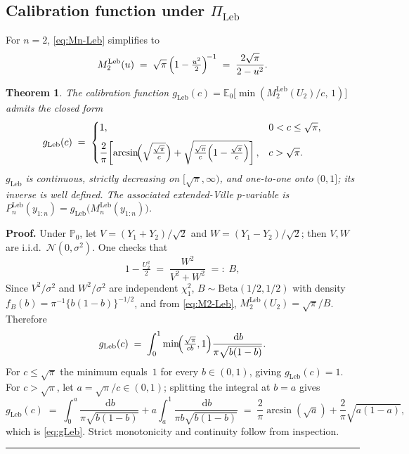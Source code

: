 \documentclass{article}%
\newtheorem{theorem}{Theorem}[section]
\newenvironment{proof}[1][Proof]{\noindent\textbf{#1.} }{\ \rule{0.5em}{0.5em}}
\newcommand{\E}{\mathbb{E}}
\newcommand{\Prob}{\mathbb{P}}
\newcommand{\dd}{\,\mathrm{d}}
\newcommand{\Leb}{\mathrm{Leb}}
\begin{document}
\subsection{Calibration function under \(\Pi_{\Leb}\)}\label{sec:calib}

For \(n=2\), \eqref{eq:Mn-Leb} simplifies to
\begin{equation}\label{eq:M2-Leb}
   M_2^{\Leb}(u)\;=\;\sqrt{\pi}\,\Bigl(1-\tfrac{u^2}{2}\Bigr)^{\!-1}
   \;=\;\frac{2\sqrt\pi}{2-u^2}.
\end{equation}

\begin{theorem}\label{thm:gLeb}
The calibration function
\(g_{\Leb}(c)=\E_0\bigl[\min(M_2^{\Leb}(U_2)/c,\,1)\bigr]\)
admits the closed form
\begin{equation}\label{eq:gLeb}
  g_{\Leb}(c)
  \;=\;
  \begin{cases}
   1, & 0<c\leq\sqrt\pi,\\[6pt]
   \dfrac{2}{\pi}\!\left[
     \arcsin\!\Bigl(\sqrt{\tfrac{\sqrt\pi}{c}}\Bigr)
     +\sqrt{\tfrac{\sqrt\pi}{c}\Bigl(1-\tfrac{\sqrt\pi}{c}\Bigr)}\right],
   & c>\sqrt\pi.
  \end{cases}
\end{equation}
\(g_{\Leb}\) is continuous, strictly decreasing on \([\sqrt\pi,\infty)\),
and one-to-one onto \((0,1]\); its inverse is well defined.
The associated extended-Ville p-variable is
\(P_n^{\Leb}(y_{1:n})=g_{\Leb}\bigl(M_n^{\Leb}(y_{1:n})\bigr)\).
\end{theorem}

\begin{proof}
Under \(\Prob_0\), let \(V=(Y_1+Y_2)/\sqrt 2\) and
\(W=(Y_1-Y_2)/\sqrt 2\); then \(V,W\) are i.i.d.\
\(\mathcal N(0,\sigma^2)\). One checks that
\[
   1-\tfrac{U_2^2}{2}\;=\;\frac{W^2}{V^2+W^2}\;=:\;B,
\]
Since $V^2/\sigma^2$ and $W^2/\sigma^2$ are independent $\chi_1^2$, \(B\sim\mathrm{Beta}(1/2,1/2)\) with density
\(f_B(b)=\pi^{-1}\{b(1-b)\}^{-1/2}\), and from \eqref{eq:M2-Leb},
\(M_2^{\Leb}(U_2)=\sqrt\pi/B\). Therefore
\[
  g_{\Leb}(c)
  \;=\;\int_0^1\min\!\Bigl(\tfrac{\sqrt\pi}{cb},1\Bigr)
       \frac{\dd b}{\pi\sqrt{b(1-b)}}.
\]
For \(c\leq\sqrt\pi\) the minimum equals~\(1\) for every
\(b\in(0,1)\), giving \(g_{\Leb}(c)=1\). For \(c>\sqrt\pi\), let
\(a=\sqrt\pi/c\in(0,1)\); splitting the integral at \(b=a\) gives
\[
  g_{\Leb}(c)\;=\;
  \int_0^a\frac{\dd b}{\pi\sqrt{b(1-b)}}
  +a\int_a^1\frac{\dd b}{\pi b\sqrt{b(1-b)}}
  \;=\;\frac{2}{\pi}\arcsin(\sqrt a)+\frac{2}{\pi}\sqrt{a(1-a)},
\]
which is \eqref{eq:gLeb}. Strict monotonicity and continuity follow
from inspection.
\end{proof}
\end{document}
